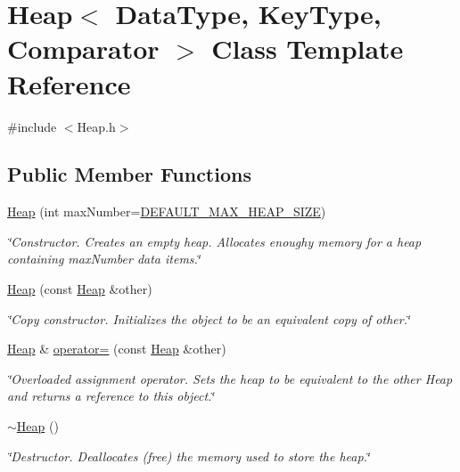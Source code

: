 \hypertarget{class_heap}{}\section{Heap$<$ Data\+Type, Key\+Type, Comparator $>$ Class Template Reference}
\label{class_heap}


{\ttfamily \#include $<$Heap.\+h$>$}

\subsection*{Public Member Functions}
\begin{DoxyCompactItemize}
\item 
\hyperlink{class_heap_ae17e34e3c86d88263a8fdf80b9ba78fc}{Heap} (int max\+Number=\hyperlink{class_heap_a967c19732a20a72e8e824402ad6763c8}{D\+E\+F\+A\+U\+L\+T\+\_\+\+M\+A\+X\+\_\+\+H\+E\+A\+P\+\_\+\+S\+I\+ZE})
\begin{DoxyCompactList}\small\item\em \char`\"{}\+Constructor. Creates an empty heap. Allocates enoughy memory for a heap containing max\+Number data items.\char`\"{} \end{DoxyCompactList}\item 
\hyperlink{class_heap_a97e3b462be1c6af31d7519546bba8907}{Heap} (const \hyperlink{class_heap}{Heap} \&other)
\begin{DoxyCompactList}\small\item\em \char`\"{}\+Copy constructor. Initializes the object to be an equivalent copy of other.\char`\"{} \end{DoxyCompactList}\item 
\hyperlink{class_heap}{Heap} \& \hyperlink{class_heap_a5ed119341c39bcea1437321d4247dd40}{operator=} (const \hyperlink{class_heap}{Heap} \&other)
\begin{DoxyCompactList}\small\item\em \char`\"{}\+Overloaded assignment operator. Sets the heap to be equivalent to the other Heap and returns a reference to this object.\char`\"{} \end{DoxyCompactList}\item 
\hyperlink{class_heap_a555ade7891007de959bef0ee53e28767}{$\sim$\+Heap} ()
\begin{DoxyCompactList}\small\item\em \char`\"{}\+Destructor. Deallocates (free) the memory used to store the heap.\char`\"{} \end{DoxyCompactList}\item 

\end{DoxyCompactItemize}
